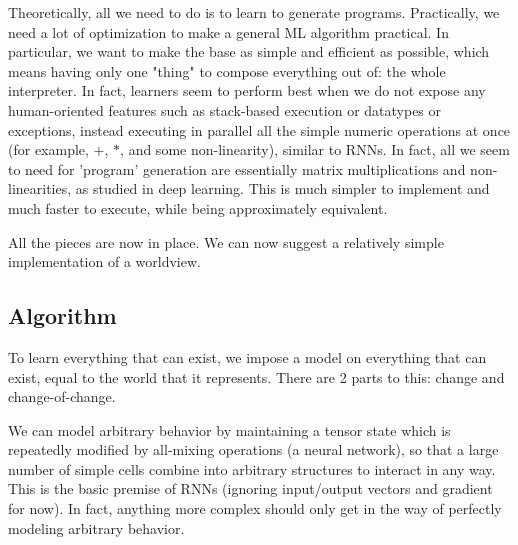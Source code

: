 \documentclass{article}
\begin{document}
\begin{itemize}
Theoretically, all we need to do is to learn to generate programs. Practically, we need a lot of optimization to make a general ML algorithm practical. In particular, we want to make the base as simple and efficient as possible, which means having only one "thing" to compose everything out of: the whole interpreter. In fact, learners seem to perform best when we do not expose any human-oriented features such as stack-based execution or datatypes or exceptions, instead executing in parallel all the simple numeric operations at once (for example, $+$, $*$, and some non-linearity), similar to RNNs. In fact, all we seem to need for 'program' generation are essentially matrix multiplications and non-linearities, as studied in deep learning. This is much simpler to implement and much faster to execute, while being approximately equivalent.
\end{itemize}

All the pieces are now in place. We can now suggest a relatively simple implementation of a worldview.

\subsection{Algorithm\label{Algorithm}}

To learn everything that can exist, we impose a model on everything that can exist, equal to the world that it represents. There are 2 parts to this: change and change-of-change.

We can model arbitrary behavior by maintaining a tensor state which is repeatedly modified by all-mixing operations (a neural network), so that a large number of simple cells combine into arbitrary structures to interact in any way. This is the basic premise of RNNs (ignoring input/output vectors and gradient for now). In fact, anything more complex should only get in the way of perfectly modeling arbitrary behavior.
\end{document}
